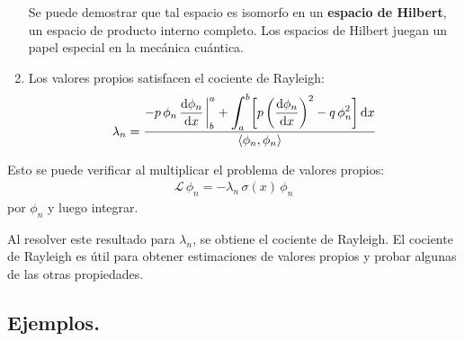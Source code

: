 \documentclass[12pt]{article}
\def\scaleint#1{\vcenter{\hbox{\scaleto[3ex]{\displaystyle\int}{#1}}}}
\def\bs{\mkern-12mu}
\numberwithin{equation}{section}
\begin{document}
\begin{enumerate}
Se puede demostrar que tal espacio es isomorfo en un \textbf{espacio de Hilbert}, un espacio de producto interno completo. Los espacios de Hilbert juegan un papel especial en la mecánica cuántica.
\item Los valores propios satisfacen el cociente de Rayleigh:
\begin{align*}
\lambda_{n} = \dfrac{- p \, \phi_{n} \, \displaystyle \dv{\phi_{n}}{x} \eval_{b}^{a} + \scaleint{6ex}_{\bs a}^{b} \bigg[ p \left( \dv{\phi_{n}}{x} \right)^{2} - q \, \phi_{n}^{2} \bigg] \dd{x}}{\langle  \phi_{n}, \phi_{n} \rangle} 
\end{align*}
\end{enumerate}
Esto se puede verificar al multiplicar el problema de valores propios:
\begin{align*}
\mathcal{L} \, \phi_{n} = - \lambda_{n} \, \sigma(x) \, \phi_{n}
\end{align*}
por $\phi_{n}$ y luego integrar.

Al resolver este resultado para $\lambda_{n}$, se obtiene el cociente de Rayleigh. El cociente de Rayleigh es útil para obtener estimaciones de valores propios y probar algunas de las otras propiedades.

\subsection{Ejemplos.}
\end{document}
